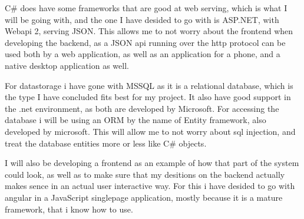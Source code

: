 C\# does have some frameworks that are good at web serving, which is what I will
be going with, and the one I have desided to go with is ASP.NET, with Webapi 2,
serving JSON. This allows me to not worry about the frontend when developing the
backend, as a JSON api running over the http protocol can be used both by a web
application, as well as an application for a phone, and a native desktop
application as well.

For datastorage i have gone with MSSQL as it is a relational database, which is
the type I have concluded fits best for my project. It also have good support in
the .net environment, as both are developed by Microsoft. For accessing the
database i will be using an ORM by the name of Entity framework, also developed
by microsoft. This will allow me to not worry about sql injection, and treat the
database entities more or less like C\# objects.

I will also be developing a frontend as an example of how that part of the
system could look, as well as to make sure that my desitions on the backend
actually makes sence in an actual user interactive way. For this i have desided
to go with angular in a JavaScript singlepage application, mostly because it is
a mature framework, that i know how to use.
